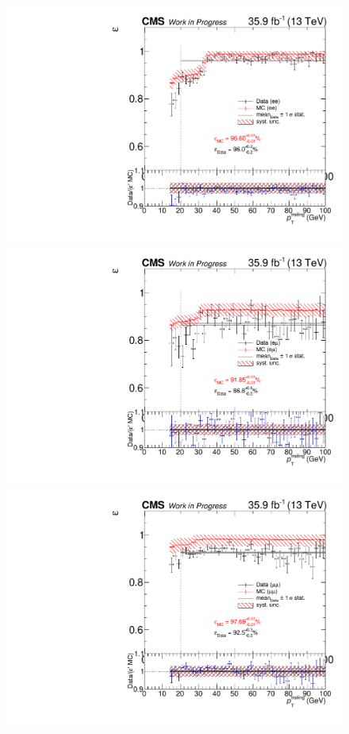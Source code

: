 \begin{figure}[htb]
 \centering
 \includegraphics[width=\pairwidth]{figures/triggerStudies/efficiency_dataHT_trigDilep_EE_pt2}
 \includegraphics[width=\pairwidth]{figures/triggerStudies/efficiency_dataHT_trigDilep_EM_pt2}
 \includegraphics[width=\pairwidth]{figures/triggerStudies/efficiency_dataHT_trigDilep_MM_pt2}

\end{figure}
